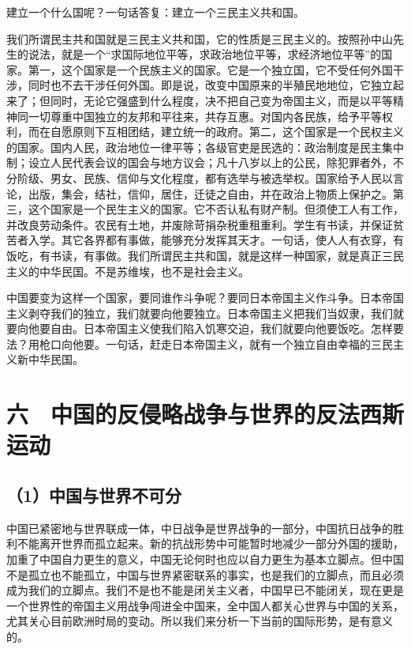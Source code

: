 建立一个什么国呢？一句话答复：建立一个三民主义共和国。

我们所谓民主共和国就是三民主义共和国，它的性质是三民主义的。按照孙中山先生的说法，就是一个“求国际地位平等，求政治地位平等，求经济地位平等”的国家。第一，这个国家是一个民族主义的国家。它是一个独立国，它不受任何外国干涉，同时也不去干涉任何外国。即是说，改变中国原来的半殖民地地位，它独立起来了；但同时，无论它强盛到什么程度，决不把自己变为帝国主义，而是以平等精神同一切尊重中国独立的友邦和平往来，共存互惠。对国内各民族，给予平等权利，而在自愿原则下互相团结，建立统一的政府。第二，这个国家是一个民权主义的国家。国内人民，政治地位一律平等；各级官吏是民选的：政治制度是民主集中制；设立人民代表会议的国会与地方议会；凡十八岁以上的公民，除犯罪者外，不分阶级、男女、民族、信仰与文化程度，都有选举与被选举权。国家给予人民以言论，出版，集会，结社，信仰，居住，迁徒之自由，并在政治上物质上保护之。第三，这个国家是一个民生主义的国家。它不否认私有财产制。但须使工人有工作，并改良劳动条件。农民有土地，并废除苛捐杂税重租重利。学生有书读，并保证贫苦者入学。其它各界都有事做，能够充分发挥其天才。一句话，使人人有衣穿，有饭吃，有书读，有事做。我们所谓民主共和国，就是这样一种国家，就是真正三民主义的中华民国。不是苏维埃，也不是社会主义。

中国要变为这样一个国家，要同谁作斗争呢？要同日本帝国主义作斗争。日本帝国主义剥夺我们的独立，我们就要向他要独立。日本帝国主义把我们当奴隶，我们就要向他要自由。日本帝国主义使我们陷入饥寒交迫，我们就要向他要饭吃。怎样要法？用枪口向他要。一句话，赶走日本帝国主义，就有一个独立自由幸福的三民主义新中华民国。

\section{六　中国的反侵略战争与世界的反法西斯运动}

\subsection{（1）中国与世界不可分}

中国已紧密地与世界联成一体，中日战争是世界战争的一部分，中国抗日战争的胜利不能离开世界而孤立起来。新的抗战形势中可能暂时地减少一部分外国的援助，加重了中国自力更生的意义，中国无论何时也应以自力更生为基本立脚点。但中国不是孤立也不能孤立，中国与世界紧密联系的事实，也是我们的立脚点，而且必须成为我们的立脚点。我们不是也不能是闭关主义者，中国早已不能闭关，现在更是一个世界性的帝国主义用战争闯进全中国来，全中国人都关心世界与中国的关系，尤其关心目前欧洲时局的变动。所以我们来分析一下当前的国际形势，是有意义的。

